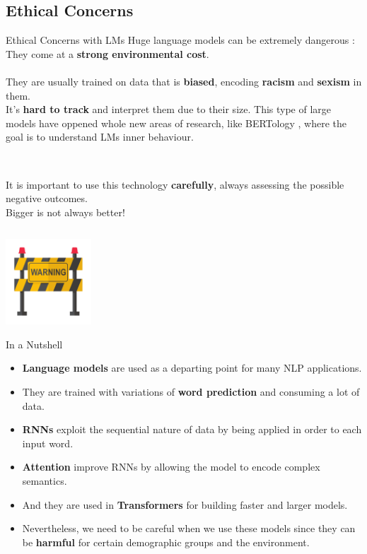 \documentclass[9pt]{beamer}
\begin{document}
\subsection{Ethical Concerns}
\begin{frame}{Ethical Concerns with LMs}
Huge language models can be extremely dangerous %
:\\ They come at a \textbf{strong environmental cost}. \\
\\ They are usually trained on data that is \textbf{biased}, encoding \textbf{racism} and \textbf{sexism} in them.\\
It's \textbf{hard to track} and interpret them due to their size. This type of large models have oppened whole new areas of research, like BERTology %
, where the goal is to understand LMs inner behaviour.
\begin{columns}[onlytextwidth]
    \begin{column}{0.60\textwidth}
    \vspace{0.1cm}\\
    It is important to use this technology \textbf{carefully}, always assessing the possible negative outcomes. 
    \\Bigger is not always better!
    \end{column}
\end{columns}
\includegraphics[width = 3.2cm]{img/warning.png}
\end{frame}

\begin{frame}{In a Nutshell}
    \begin{itemize}
        \item \textbf{Language models} are used as a departing point for many NLP applications.
        \item They are trained with variations of \textbf{word prediction} and consuming a lot of data.
        \item \textbf{RNNs} exploit the sequential nature of data by being applied in order to each input word.
        \item \textbf{Attention} improve RNNs by allowing the model to encode complex semantics.
        \item And they are used in \textbf{Transformers} for building faster and larger models.
        \item Nevertheless, we need to be careful when we use these models since they can be \textbf{harmful} for certain demographic groups and the environment.
    \end{itemize}
\end{frame}
\end{document}
